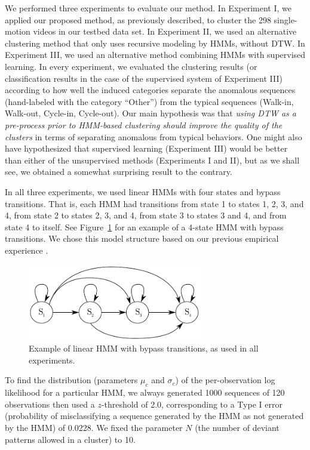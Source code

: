 We performed three experiments to evaluate our method. In Experiment
I, we applied our proposed method, as previously described, to cluster
the 298 single-motion videos in our testbed data set. In Experiment
II, we used an alternative clustering method that only uses recursive
modeling by HMMs, without DTW. In Experiment III, we used an
alternative method combining HMMs with supervised learning. In every
experiment, we evaluated the clustering results (or classification
results in the case of the supervised system of Experiment III)
according to how well the induced categories separate the anomalous
sequences (hand-labeled with the category ``Other'') from the typical
sequences (Walk-in, Walk-out, Cycle-in, Cycle-out). Our main
hypothesis was that \textit{using DTW as a pre-process prior to
HMM-based clustering should improve the quality of the clusters} in
terms of separating anomalous from typical behaviors. One might also
have hypothesized that supervised learning (Experiment III) would be
better than either of the unsupervised methods (Experiments I and II),
but as we shall see, we obtained a somewhat surprising result to the
contrary.

In all three experiments, we used linear HMMs with four states and bypass
transitions. That is, each HMM had transitions from state 1 to states 1, 2, 3,
and 4, from state 2 to states 2, 3, and 4, from state 3 to states 3 and 4, and
from state 4 to itself. See Figure~\ref{fig:hmm-with-bypass-transitions} for an
example of a 4-state HMM with bypass transitions.  We chose this model
structure based on our previous empirical experience .

\begin{figure}[t]
    \centering
    \includegraphics[width=3in]{figures/hmm-with-bypass-transitions}
    \caption[Example of linear HMM with bypass transitions, as used in 
        all experiments.]{\small Example of linear HMM with bypass 
        transitions, as used in all experiments.}
    \label{fig:hmm-with-bypass-transitions}
\end{figure}

To find the distribution (parameters $\mu_c$ and $\sigma_c$) of the
per-observation log likelihood for a particular HMM, we always
generated 1000 sequences of 120 observations then used a $z$-threshold
of 2.0, corresponding to a Type I error (probability of misclassifying
a sequence generated by the HMM as not generated by the HMM) of
0.0228.  We fixed the parameter $N$ (the number of deviant patterns
allowed in a cluster) to 10.

